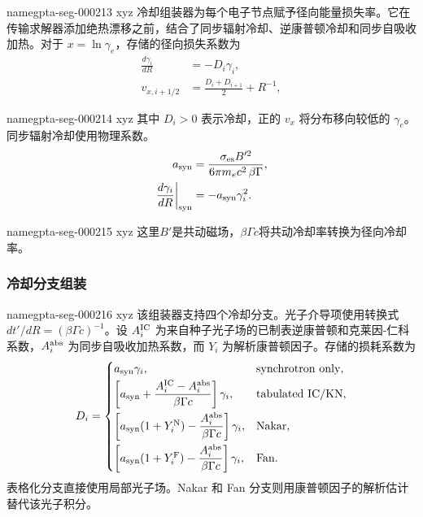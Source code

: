 \documentclass[twocolumn]{aastex702}
\makeatletter
\providecommand{\gptareaderanchor}[1]{\pdfdest name{#1} xyz}%
\providecommand{\gptareaderanchor}[1]{\special{pdf:dest (#1) [ @thispage /XYZ @xpos @ypos null ]}}%
\makeatother
\begin{document}
\gptareaderanchor{gpta-seg-000213}%
冷却组装器为每个电子节点赋予径向能量损失率。它在传输求解器添加绝热漂移之前，结合了同步辐射冷却、逆康普顿冷却和同步自吸收加热。对于 \(x=\ln\gamma_e\)，存储的径向损失系数为
\begin{equation}
\begin{aligned}
\frac{d\gamma_i}{dR}&=-D_i\gamma_i,\\
v_{x,i+1/2}
&=\frac{D_i+D_{i+1}}{2}+R^{-1},
\end{aligned}
\end{equation}

\gptareaderanchor{gpta-seg-000214}%
其中 \(D_i>0\) 表示冷却，正的 \(v_x\) 将分布移向较低的 \(\gamma_e\)。同步辐射冷却使用物理系数。
\begin{equation}
\begin{aligned}
a_{\rm syn}&=\frac{\sigma_{\rm es} B'^2}{6\pi m_e c^2\,\beta\Gamma},\\
\left.\frac{d\gamma_i}{dR}\right|_{\rm syn}
&=-a_{\rm syn}\gamma_i^2 .
\end{aligned}
\end{equation}

\gptareaderanchor{gpta-seg-000215}%
这里\(B'\)是共动磁场，\(\beta\Gamma c\)将共动冷却率转换为径向冷却率。

\subsubsection{冷却分支组装}


\gptareaderanchor{gpta-seg-000216}%
该组装器支持四个冷却分支。光子介导项使用转换式 \(dt'/dR=(\beta\Gamma c)^{-1}\)。设 \(A_i^{\rm IC}\) 为来自种子光子场的已制表逆康普顿和克莱因-仁科系数，\(A_i^{\rm abs}\) 为同步自吸收加热系数，而 \(Y_i\) 为解析康普顿因子。存储的损耗系数为
\begin{equation}
D_i=
\begin{cases}
a_{\rm syn}\gamma_i, & \mathrm{synchrotron\ only},\\[0.6ex]
\left[a_{\rm syn}+
\dfrac{A_i^{\rm IC}-A_i^{\rm abs}}{\beta\Gamma c}
\right]\gamma_i, & \mathrm{tabulated\ IC/KN},\\[2ex]
\left[a_{\rm syn}(1+Y_i^{\rm N})
-\dfrac{A_i^{\rm abs}}{\beta\Gamma c}
\right]\gamma_i, & \mathrm{Nakar},\\[2ex]
\left[a_{\rm syn}(1+Y_i^{\rm F})
-\dfrac{A_i^{\rm abs}}{\beta\Gamma c}
\right]\gamma_i, & \mathrm{Fan}.
\end{cases}
\label{eq:electron-forward-cooling-assembly}
\end{equation}
表格化分支直接使用局部光子场。Nakar 和 Fan 分支则用康普顿因子的解析估计替代该光子积分。
\end{document}
